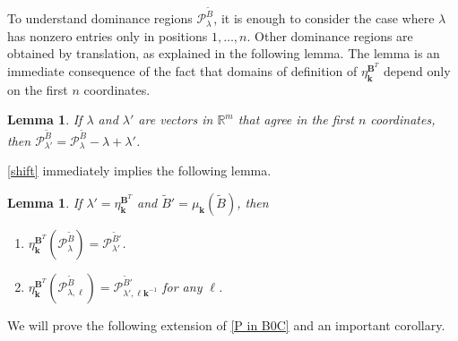 \documentclass{amsart}
\newtheorem{lemma}[proposition]{Lemma}
\theoremstyle{definition}
\theoremstyle{remark}
\numberwithin{equation}{section}
\newcommand{\reals}{\mathbb R}
\newcommand{\0}{{\mathbf{0}}}
\newcommand{\kk}{\mathbf{k}}
\renewcommand{\ll}{{\boldsymbol\ell}}
\newcommand{\tB}{{\tilde{B}}}
\newcommand{\BB}{\mathbf{B}}
\renewcommand{\P}{\mathcal{P}}
\begin{document}
To understand dominance regions $\P^\tB_\lambda$, it is enough to consider the case where $\lambda$ has nonzero entries only in positions $1,\ldots,n$.
Other dominance regions are obtained by translation, as explained in the following lemma.
The lemma is an immediate consequence of the fact that domains of definition of $\eta_\kk^{\BB^T}$ depend only on the first $n$ coordinates.
\begin{lemma}\label{after all coefficients are just coefficients}
If $\lambda$ and $\lambda'$ are vectors in $\reals^m$ that agree in the first $n$ coordinates, then $\P^\tB_{\lambda'}=\P^\tB_\lambda-\lambda+\lambda'$.
\end{lemma}

\cref{shift} immediately implies the following lemma.
\begin{lemma}\label{shift extended}
If $\lambda'=\eta^{\BB^T}_\kk$ and $\tB'=\mu_\kk(\tB)$, then 
\begin{enumerate}[\quad\bf1.]
\item \label{shift all}
$\eta^{\BB^T}_\kk\!\!(\P^\tB_\lambda)=\P^{\tB'}_{\lambda'}$.
\item \label{shift one}
$\eta^{\BB^T}_\kk\!\!(\P^\tB_{\lambda,\ll})=\P^{\tB'}_{\lambda',\ll\kk^{-1}}$ for any $\ll$.
\end{enumerate}
\end{lemma}



We will prove the following extension of \cref{P in B0C} and an important corollary.
\end{document}
